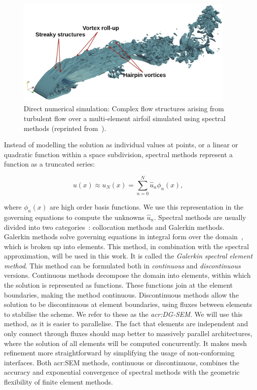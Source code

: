 \begin{figure}[H]
	\centering
	\includegraphics[width=0.95\textwidth]{Chapter_introduction/media/spectral_element_method}
	\caption{Direct numerical simulation: Complex flow structures arising from turbulent flow over a multi-element airfoil simulated using spectral methods (reprinted from~\cite{Vadsola2021}).}\label{fig:intro_sem}
\end{figure}

Instead of modelling the solution as individual values at points, or a linear or quadratic function
within a space subdivision, spectral methods represent a function as a truncated series:

\begin{equation}
	u(x) \approx u_N(x) = \sum_{n = 0}^{N} \widehat{u}_n \phi _n(x),
\end{equation}

\noindent
where \(\phi _n(x)\) are high order basis functions. We use this representation in the governing
equations to compute the unknowns \(\widehat{u}_n\). Spectral methods are usually divided into two
categories~\cite{Karniadakis2005}: collocation methods and Galerkin methods. Galerkin methods solve
governing equations in integral form over the domain~\cite{Reed1973}, which is broken up into
elements. This method, in combination with the spectral approximation, will be used in this work. It
is called the \textit{Galerkin spectral element method}. This method can be formulated both in
\textit{continuous} and \textit{discontinuous} versions. Continuous methods decompose the domain
into elements, within which the solution is represented as functions. These functions join at the
element boundaries, making the method continuous. Discontinuous methods allow the solution to be
discontinuous at element boundaries, using fluxes between elements to stabilise the scheme. We refer
to these as the \textit{\acrfull{acr:DG-SEM}}. We will use this method, as it is easier to
parallelise. The fact that elements are independent and only connect through fluxes should map
better to massively parallel architectures, where the solution of all elements will be computed
concurrently. It makes mesh refinement more straightforward by simplifying the usage of
non-conforming interfaces. Both \acrshort{acr:SEM} methods, continuous or discontinuous, combines
the accuracy and exponential convergence of spectral methods with the geometric flexibility of
finite element methods. 

